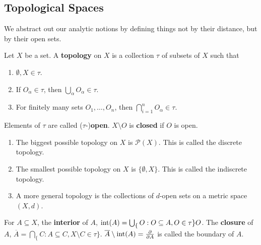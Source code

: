 \subsection{Topological Spaces}
We abstract out our analytic notions by defining things not by their distance, but by their open sets.
\begin{definition}
    Let $X$ be a set. A \textbf{topology} on $X$ is a collection $\tau$ of subsets of $X$ such that
    \begin{enumerate}
        \item $\emptyset, X \in \tau$.
        \item If $O_{\alpha} \in \tau$, then $\bigcup_{\alpha} O_{\alpha} \in \tau$.
        \item For finitely many sets $O_1, \dots, O_n$, then $\bigcap_{i = 1}^n O_{\alpha} \in \tau$.
    \end{enumerate}
    Elements of $\tau$ are called ($\tau$-)\textbf{open}. $X \setminus O$ is \textbf{closed} if $O$ is open.
\end{definition}
\begin{example}
    \begin{enumerate}
        \item The biggest possible topology on $X$ is $\mathcal{P}(X)$. This is called the discrete topology.
        \item The smallest possible topology on $X$ is $\{\emptyset, X\}$. This is called the indiscrete topology.
        \item A more general topology is the collections of $d$-open sets on a metric space $(X, d)$.
    \end{enumerate}
\end{example}
\begin{definition}
    For $A \subseteq X$, the \textbf{interior} of $A$, $\operatorname{int}(A) = \bigcup_\{O :O \subseteq A, O \in \tau\} O$.
    The \textbf{closure} of $A$, $\overline{A} = \bigcap_\{C: A \subseteq C, X \setminus C \in \tau\} $.
    $\overline{A} \setminus \operatorname{int}(A) = \pdv{A}$ is called the boundary of $A$.
\end{definition}